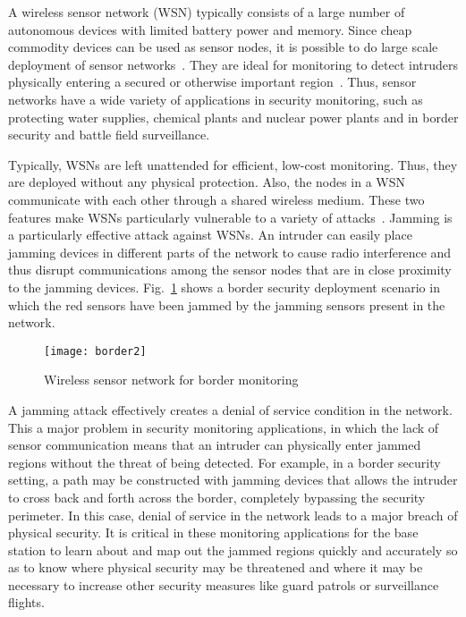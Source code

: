 \documentclass[conference]{IEEEtran}
\begin{document}
A wireless sensor network (WSN) typically consists of a large number of
autonomous devices with limited battery power and memory. Since cheap
commodity devices can be used as sensor nodes, it is possible to do
large scale deployment of sensor networks~\cite{WSN, WSN2}. They are
ideal for monitoring to detect intruders physically entering a secured
or otherwise important region~\cite{he04energy}. Thus, sensor networks
have a wide variety of applications in security monitoring, such as
protecting water supplies, chemical plants and nuclear power plants and
in border security and battle field surveillance.

Typically, WSNs are left unattended for efficient, low-cost
monitoring. Thus, they are deployed without any physical
protection. Also, the nodes in a WSN communicate with each other through
a shared wireless medium. These two features make WSNs particularly
vulnerable to a variety of attacks~\cite{ATT0, ATT1, ATT2}.  Jamming
\cite{FEASJAM, ATTJAM} is a particularly effective attack against
WSNs. An intruder can easily place jamming devices in different parts of
the network to cause radio interference and thus disrupt communications
among the sensor nodes that are in close proximity to the jamming
devices. Fig.~\ref{fig:border} shows a border security deployment
scenario in which the red sensors have been jammed by the jamming sensors present in the network.

\begin{figure}[hpb]
  \begin{center}
    \texttt{[image: border2]}
   \end{center}
  \caption{Wireless sensor network for border monitoring}
  \label{fig:border}
\end{figure}

A jamming attack effectively creates a denial of service condition in
the network. This a major problem in security monitoring applications,
in which the lack of sensor communication means that an intruder can
physically enter jammed regions without the threat of being
detected. For example, in a border security setting, a path may be
constructed with jamming devices that allows the intruder to cross back
and forth across the border, completely bypassing the security
perimeter. In this case, denial of service in the network leads to a
major breach of physical security. It is critical in these
monitoring applications for the base station to learn about and map out the
jammed regions quickly and accurately so as to know where
physical security may be threatened and where it may be necessary to
increase other security measures like guard patrols or surveillance
flights. 
\end{document}
